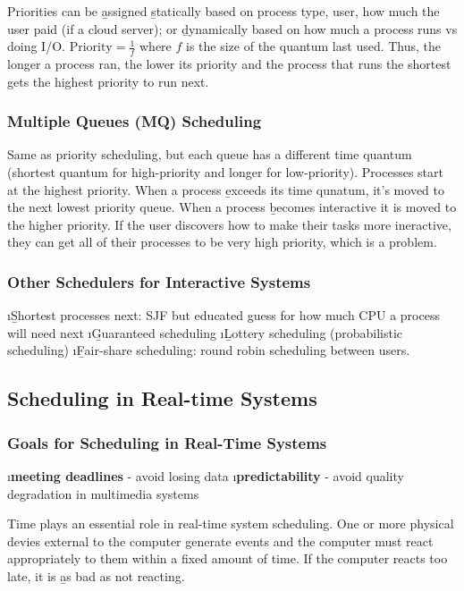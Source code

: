 \documentclass{article}
\begin{document}
    \noindent Priorities can be \b{assigned} \b{statically} based on process type, user, how much the user paid (if a cloud server); or \b{dynamically} based on how much a process runs vs doing I/O. $\textrm{Priority} = \frac{1}{f}$ where $f$ is the size of the quantum last used. Thus, the longer a process ran, the lower its priority and the process that runs the shortest gets the highest priority to run next.

    \subsubsection{Multiple Queues (MQ) Scheduling}

    Same as priority scheduling, but each queue has a different time quantum (shortest quantum for high-priority and longer for low-priority). Processes start at the highest priority. When a process \b{exceeds} its time qunatum, it's moved to the next lowest priority queue. When a process \b{becomes interactive} it is moved to the higher priority. If the user discovers how to make their tasks more ineractive, they can get all of their processes to be very high priority, which is a problem. 

    \subsubsection{Other Schedulers for Interactive Systems}

    \bl 
    \i \b{Shortest processes next}: SJF but educated guess for how much CPU a process will need next
    \i \b{Guaranteed scheduling}
    \i \b{Lottery scheduling} (probabilistic scheduling)
    \i \b{Fair-share scheduling}: round robin scheduling between users. 
    \el

\subsection{Scheduling in Real-time Systems}
    
    \subsubsection{Goals for Scheduling in Real-Time Systems}

    \bl
    \i \textbf{meeting deadlines} - avoid losing data
    \i \textbf{predictability} - avoid quality degradation in multimedia systems
    \el

    \noindent Time plays an essential role in real-time system scheduling. One or more physical devies external to the computer generate events and the computer must react appropriately to them within a fixed amount of time. If the computer reacts too late, it is \b{as bad as not reacting}. \\
\end{document}
